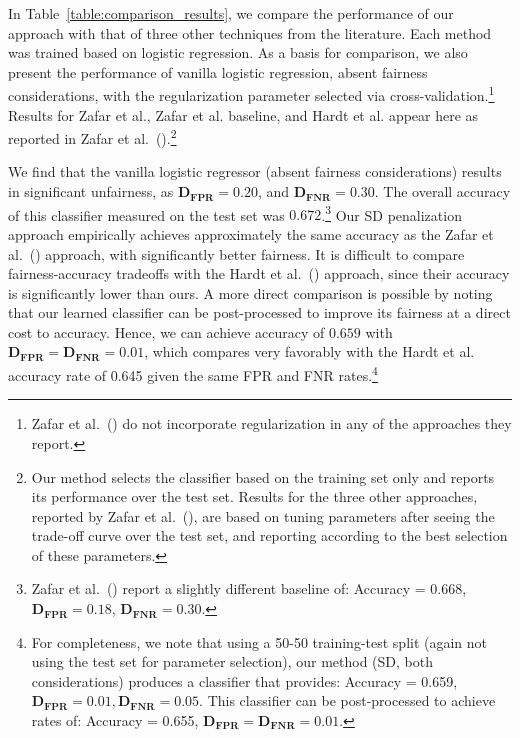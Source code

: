 In Table~\ref{table:comparison_results}, we compare the performance of our approach with that of three other techniques from the literature. Each method was trained based on logistic regression.  As a basis for comparison, we also present the performance of vanilla logistic regression, absent fairness considerations, with the regularization parameter selected via cross-validation.\footnote{Zafar et al.~(\citeyear{disparatemistreatment}) do not incorporate regularization in any of the approaches they report.}
Results for Zafar et al., Zafar et al. baseline, and Hardt et al. appear here as reported in Zafar et al.~(\citeyear{disparatemistreatment}).\footnote{Our method selects the classifier based on the training set only and reports its performance over the test set. Results for the three other approaches, reported by Zafar et al.~(\citeyear{disparatemistreatment}), are based on tuning parameters after seeing the trade-off curve over the test set, and reporting according to the best selection of these parameters.}

We find that the vanilla logistic regressor (absent fairness considerations) results in significant unfairness, as $\mathbf{D_{FPR}}=0.20$, and $\mathbf{D_{FNR}}=0.30$. The overall accuracy of this classifier measured on the test set was $0.672$.\footnote{Zafar et al.~(\citeyear{disparatemistreatment}) report a slightly different baseline of: Accuracy = 0.668, $\mathbf{D_{FPR}}=0.18$, $\mathbf{D_{FNR}}=0.30$.} Our SD penalization approach empirically achieves approximately the same accuracy as the Zafar et al.~(\citeyear{disparatemistreatment}) approach, with significantly better fairness. It is difficult to compare fairness-accuracy tradeoffs with the Hardt et al.~(\citeyear{hardt}) approach, since their accuracy is significantly lower than ours. A more direct comparison is possible by noting that our learned classifier can be post-processed to improve its fairness at a direct cost to accuracy. Hence, we can achieve accuracy of $0.659$ with $\mathbf{D_{FPR}} = \mathbf{D_{FNR}} = 0.01$, which compares very favorably with the Hardt et al. accuracy rate of 0.645 given the same FPR and FNR rates.\footnote{For completeness, we note that using a 50-50 training-test split (again not using the test set for parameter selection), our method (SD, both considerations) produces a classifier that provides: Accuracy = 0.659, $\mathbf{D_{FPR}} = 0.01, \mathbf{D_{FNR}} = 0.05$. This classifier can be post-processed to achieve rates of: Accuracy = 0.655, $\mathbf{D_{FPR}} = \mathbf{D_{FNR}} = 0.01$.}


